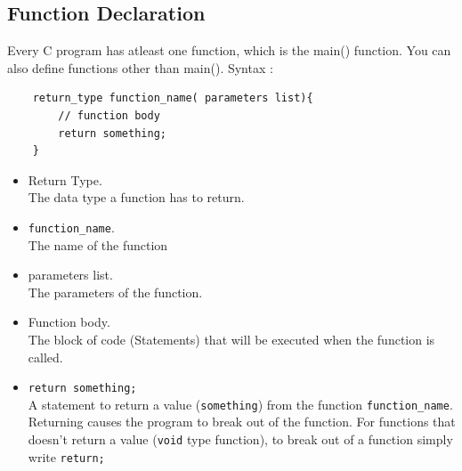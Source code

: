 \subsection{Function Declaration}
Every C program has atleast one function, which is the main() function. You can also define functions other than main().
Syntax :
\begin{verbatim}
    return_type function_name( parameters list){
        // function body
    	return something;
    }
\end{verbatim}
\begin{itemize}
	\item Return Type.\\ The data type a function has to return.
	\item \verb*|function_name|.\\ The name of the function
    \item parameters list.\\ 
    The parameters of the function.
	\item Function body.\\ The block of code (Statements) that will be executed when the function is called.
	\item \verb|return something;|\\ A statement to return a value (\verb|something|) from the function \verb*|function_name|. 
    Returning causes the program to break out of the function.
    For functions that doesn't return a value (\verb|void| type function), to break out of a function simply write \verb|return;|
\end{itemize}  


